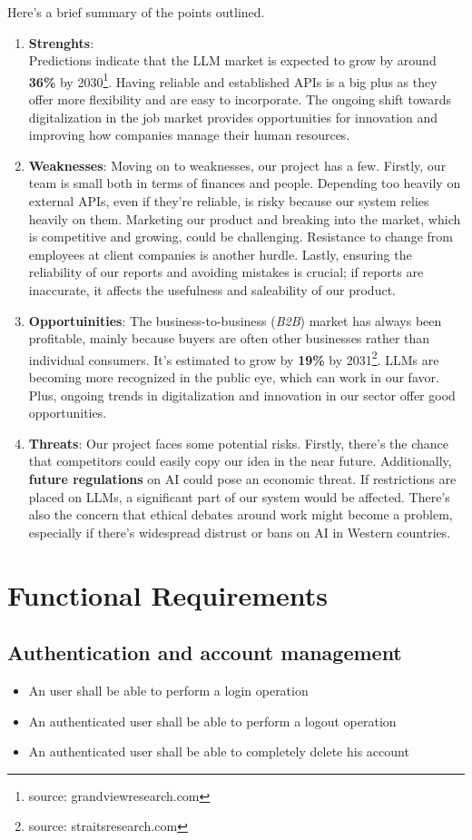 \documentclass{article}
\begin{document}
Here's a brief summary of the points outlined.
\begin{enumerate}
    \item \textbf{Strenghts}:\\
Predictions indicate that the LLM market is expected to grow by around \textbf{36\%} by 2030\footnote{source: grandviewresearch.com}. Having reliable and established APIs is a big plus as they offer more flexibility and are easy to incorporate. The ongoing shift towards digitalization in the job market provides opportunities for innovation and improving how companies manage their human resources.
    \item \textbf{Weaknesses}:
Moving on to weaknesses, our project has a few. Firstly, our team is small both in terms of finances and people. Depending too heavily on external APIs, even if they're reliable, is risky because our system relies heavily on them. Marketing our product and breaking into the market, which is competitive and growing, could be challenging. Resistance to change from employees at client companies is another hurdle. Lastly, ensuring the reliability of our reports and avoiding mistakes is crucial; if reports are inaccurate, it affects the usefulness and saleability of our product.
    \item \textbf{Opportuinities}:
The business-to-business (\textit{B2B}) market has always been profitable, mainly because buyers are often other businesses rather than individual consumers. It's estimated to grow by \textbf{19\%} by 2031\footnote{source: straitsresearch.com}. LLMs are becoming more recognized in the public eye, which can work in our favor. Plus, ongoing trends in digitalization and innovation in our sector offer good opportunities.
    \item \textbf{Threats}:
Our project faces some potential risks. Firstly, there's the chance that competitors could easily copy our idea in the near future. Additionally, \textbf{future regulations} on AI could pose an economic threat. If restrictions are placed on LLMs, a significant part of our system would be affected. There's also the concern that ethical debates around work might become a problem, especially if there's widespread distrust or bans on AI in Western countries.
\end{enumerate}


\section{Functional Requirements}
\subsection{Authentication and account management}
\begin{itemize}
    \item An user shall be able to perform a login operation
    \item An authenticated user shall be able to perform a logout operation
    \item An authenticated user shall be able to completely delete his account
\end{itemize}
\end{document}
